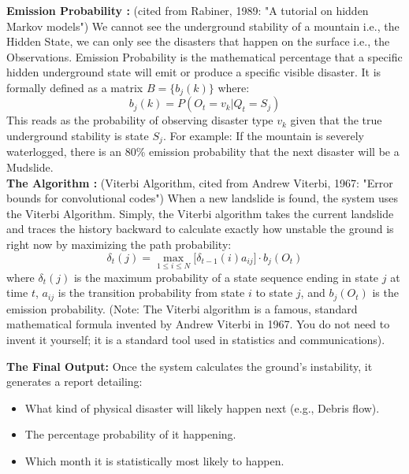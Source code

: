 \documentclass[11pt,a4paper]{article}
\begin{document}
\textbf{Emission Probability :} (cited from Rabiner, 1989: "A tutorial on hidden Markov models") We cannot see the underground stability of a mountain i.e., the Hidden State, we can only see the disasters that happen on the surface i.e., the Observations. Emission Probability is the mathematical percentage that a specific hidden underground state will emit or produce a specific visible disaster. It is formally defined as a matrix $B = \{b_j(k)\}$ where:
\begin{equation}
    b_j(k) = P(O_t = v_k | Q_t = S_j)
\end{equation}
This reads as the probability of observing disaster type $v_k$ given that the true underground stability is state $S_j$. For example: If the mountain is severely waterlogged, there is an 80\% emission probability that the next disaster will be a Mudslide. \\

\textbf{The Algorithm :} (Viterbi Algorithm, cited from Andrew Viterbi, 1967: "Error bounds for convolutional codes") When a new landslide is found, the system uses the Viterbi Algorithm. Simply, the Viterbi algorithm takes the current landslide and traces the history backward to calculate exactly how unstable the ground is right now by maximizing the path probability:
\begin{equation}
    \delta_t(j) = \max_{1 \le i \le N} \Big[ \delta_{t-1}(i) a_{ij} \Big] \cdot b_j(O_t)
\end{equation}
where $\delta_t(j)$ is the maximum probability of a state sequence ending in state $j$ at time $t$, $a_{ij}$ is the transition probability from state $i$ to state $j$, and $b_j(O_t)$ is the emission probability. (Note: The Viterbi algorithm is a famous, standard mathematical formula invented by Andrew Viterbi in 1967. You do not need to invent it yourself; it is a standard tool used in statistics and communications).




\textbf{The Final Output:} Once the system calculates the ground's instability, it generates a report detailing:
\begin{itemize}
    \item What kind of physical disaster will likely happen next (e.g., Debris flow).
    \item The percentage probability of it happening.
    \item Which month it is statistically most likely to happen.
\end{itemize}
\end{document}
